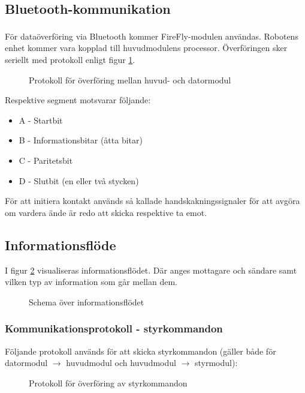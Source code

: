 \documentclass[11pt]{article}
\begin{document}
\begin{flushleft}
\subsection{Bluetooth\textsuperscript{\circledR}-kommunikation}
För dataöverföring via Bluetooth\textsuperscript{\circledR} kommer FireFly-modulen användas. Robotens enhet kommer vara kopplad till huvudmodulens processor. Överföringen sker seriellt med protokoll enligt figur \ref{bluetooth}.

\begin{figure}[htbp]
\centering
\noindent\resizebox{.8\linewidth}{!}{
	}
	\caption{Protokoll för överföring mellan huvud- och datormodul \label{bluetooth}}	
\end{figure}

Respektive segment motsvarar följande:
\begin{itemize}
	\item A - Startbit
	\item B - Informationsbitar (åtta bitar)
	\item C - Paritetsbit
	\item D - Slutbit (en eller två stycken)
\end{itemize}

För att initiera kontakt används så kallade handskakningssignaler för att avgöra om vardera ände är redo att skicka respektive ta emot.

\subsection{Informationsflöde}
I figur \ref{informationFlow} visualiseras informationsflödet. Där anges mottagare och sändare samt vilken typ av information som går mellan dem.

\begin{figure}[htbp]
\centering
\noindent\resizebox{.8\linewidth}{!}{
	}
	\caption{Schema över informationsflödet\label{informationFlow}}	
\end{figure}

\subsubsection{Kommunikationsprotokoll - styrkommandon}
Följande protokoll används för att skicka styrkommandon (gäller både för datormodul $\rightarrow$ huvudmodul och huvudmodul $\rightarrow$ styrmodul):

\begin{figure}[htbp]
\centering
\noindent\resizebox{.8\linewidth}{!}{
	}
	\caption{Protokoll för överföring av styrkommandon\label{styrdata}}	
\end{figure}


\end{flushleft}
\end{document}

